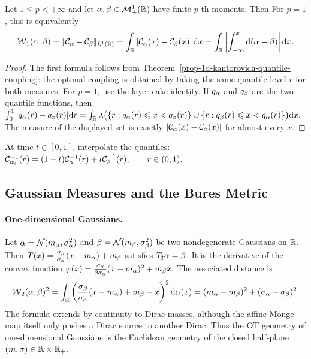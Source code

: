 \begin{prop}\label{prop-wass-quantile-1d}
Let $1\leq p<+\infty$ and let $\alpha,\beta\in\mathcal{M}_+^1(\mathbb{R})$ have finite $p$-th moments. Then
For $p=1$, this is equivalently
\begin{equation}\label{eq-w1-1d}
\operatorname{\mathcal{W}}_1(\alpha,\beta)
=
|\!| \mathcal{C}_{\alpha}-\mathcal{C}_{\beta} |\!|_{L^1(\mathbb{R})}
=
\int_{\mathbb{R}} \left\lvert\mathcal{C}_{\alpha}(x)-\mathcal{C}_{\beta}(x)\right\rvert\mathrm{d} x
=
\int_{\mathbb{R}} \left\lvert\int_{-\infty}^x\mathrm{d}(\alpha-\beta)\right\rvert\mathrm{d} x.
\end{equation}
\end{prop}
\begin{proof}
The first formula follows from Theorem~\ref{prop-1d-kantorovich-quantile-coupling}: the optimal coupling is obtained by taking the same quantile level $r$ for both measures. For $p=1$, use the layer-cake identity. If $q_\alpha$ and $q_\beta$ are the two quantile functions, then
\(\int_0^1 |q_\alpha(r)-q_\beta(r)|\mathrm{d} r = \int_{\mathbb{R}} \lambda\bigl(\{r:q_\alpha(r)\leqslant x<q_\beta(r)\}\cup\{r:q_\beta(r)\leqslant x<q_\alpha(r)\}\bigr)\mathrm{d} x.\)
The measure of the displayed set is exactly $|\mathcal{C}_{\alpha}(x)-\mathcal{C}_{\beta}(x)|$ for almost every $x$.
\end{proof}
At time $t\in[0,1]$, interpolate the quantiles: \(\mathcal{C}_{\alpha_t}^{-1}(r) = (1-t)\mathcal{C}_{\alpha}^{-1}(r)+t\mathcal{C}_{\beta}^{-1}(r), \qquad r\in(0,1).\)
\subsection{Gaussian Measures and the Bures Metric}
\label{sec-gaussian-bures}
\paragraph{One-dimensional Gaussians.}
Let $\alpha=\mathcal{N}(m_\alpha,\sigma_\alpha^2)$ and $\beta=\mathcal{N}(m_\beta,\sigma_\beta^2)$ be two nondegenerate Gaussians on $\mathbb{R}$. Then
\(T(x)=\frac{\sigma_\beta}{\sigma_\alpha}(x-m_\alpha)+m_\beta\)
satisfies $T_\sharp\alpha=\beta$. It is the derivative of the convex function
\(\varphi(x)=\frac{\sigma_\beta}{2\sigma_\alpha}(x-m_\alpha)^2+m_\beta x,\)
The associated distance is
\[
\operatorname{\mathcal{W}}_2(\alpha,\beta)^2
=
\int_{\mathbb{R}}\left(\frac{\sigma_\beta}{\sigma_\alpha}(x-m_\alpha)+m_\beta-x\right)^2\mathrm{d}\alpha(x)
=
(m_\alpha-m_\beta)^2+(\sigma_\alpha-\sigma_\beta)^2.
\]
The formula extends by continuity to Dirac masses, although the affine Monge map itself only pushes a Dirac source to another Dirac. Thus the OT geometry of one-dimensional Gaussians is the Euclidean geometry of the closed half-plane $(m,\sigma)\in\mathbb{R}\times\mathbb{R}_+$.

